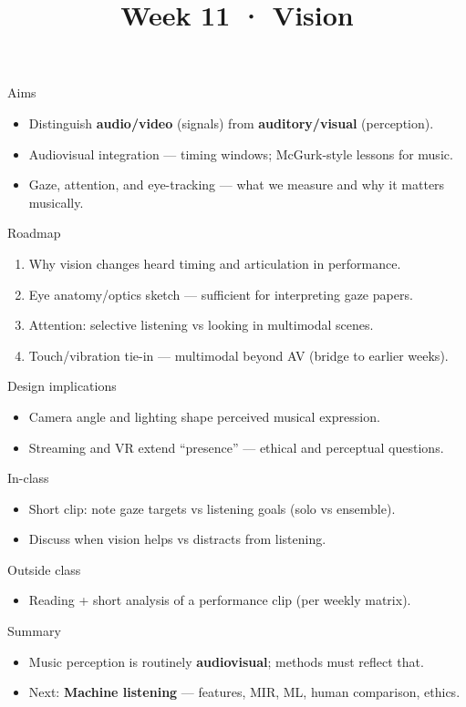 \documentclass[aspectratio=169]{beamer}
\title{Week 11 · Vision}
\subtitle{\coursename}
\institute{\instituteuo}
\date{}
\begin{document}
\begin{frame}
  \titlepage
\end{frame}

\begin{frame}{Aims}
  \begin{itemize}
    \item Distinguish \textbf{audio/video} (signals) from \textbf{auditory/visual} (perception).
    \item Audiovisual integration — timing windows; McGurk-style lessons for music.
    \item Gaze, attention, and eye-tracking — what we measure and why it matters musically.
  \end{itemize}
\end{frame}

\begin{frame}{Roadmap}
  \begin{enumerate}
    \item Why vision changes heard timing and articulation in performance.
    \item Eye anatomy/optics sketch — sufficient for interpreting gaze papers.
    \item Attention: selective listening vs looking in multimodal scenes.
    \item Touch/vibration tie-in — multimodal beyond AV (bridge to earlier weeks).
  \end{enumerate}
\end{frame}

\begin{frame}{Design implications}
  \begin{itemize}
    \item Camera angle and lighting shape perceived musical expression.
    \item Streaming and VR extend ``presence'' — ethical and perceptual questions.
  \end{itemize}
\end{frame}

\begin{frame}{In-class}
  \begin{itemize}
    \item Short clip: note gaze targets vs listening goals (solo vs ensemble).
    \item Discuss when vision helps vs distracts from listening.
  \end{itemize}
\end{frame}

\begin{frame}{Outside class}
  \begin{itemize}
    \item Reading + short analysis of a performance clip (per weekly matrix).
  \end{itemize}
\end{frame}

\begin{frame}{Summary}
  \begin{itemize}
    \item Music perception is routinely \textbf{audiovisual}; methods must reflect that.
    \item Next: \textbf{Machine listening} — features, MIR, ML, human comparison, ethics.
  \end{itemize}
\end{frame}
\end{document}
